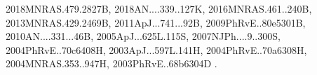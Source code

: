 \documentclass[12pt]{article}
\begin{document}
\begin{enumerate}
\begin{enumerate}
{2018MNRAS.479.2827B,%
2018AN....339..127K,%
2016MNRAS.461..240B,%
2013MNRAS.429.2469B,%
2011ApJ...741...92B,%
2009PhRvE..80e5301B,%
2010AN....331...46B,%
2005ApJ...625L.115S,%
2007NJPh....9..300S,%
2004PhRvE..70c6408H,%
2003ApJ...597L.141H,%
2004PhRvE..70a6308H,%
2004MNRAS.353..947H,%
2003PhRvE..68b6304D%
}.


\end{enumerate}
\end{enumerate}
\end{document}

